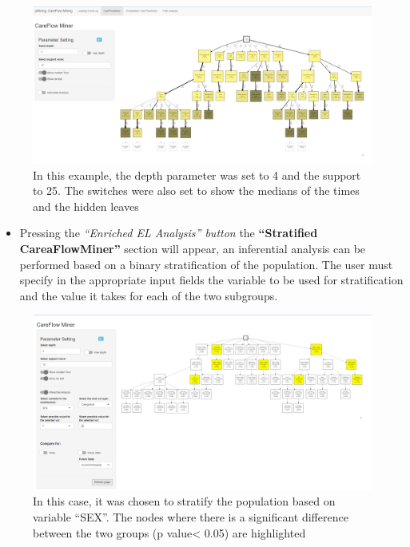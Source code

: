 \documentclass[
]{book}
\providecommand{\tightlist}{%
  \setlength{\itemsep}{0pt}\setlength{\parskip}{0pt}}
\begin{document}
\begin{figure}
\centering
\includegraphics[width=1\textwidth,height=\textheight]{images/CFM_sect1.png}
\caption{In this example, the depth parameter was set to 4 and the support to 25. The switches were also set to show the medians of the times and the hidden leaves}
\end{figure}

\begin{itemize}
\tightlist
\item
  Pressing the \emph{``Enriched EL Analysis'' button} the \textbf{``Stratified CareaFlowMiner''} section will appear, an inferential analysis can be performed based on a binary stratification of the population. The user must specify in the appropriate input fields the variable to be used for stratification and the value it takes for each of the two subgroups.
\end{itemize}

\begin{figure}
\centering
\includegraphics[width=1\textwidth,height=\textheight]{images/CFM_sec1_2.png}
\caption{In this case, it was chosen to stratify the population based on variable ``SEX''. The nodes where there is a significant difference between the two groups (p value\textless{} 0.05) are highlighted}
\end{figure}
\end{document}
